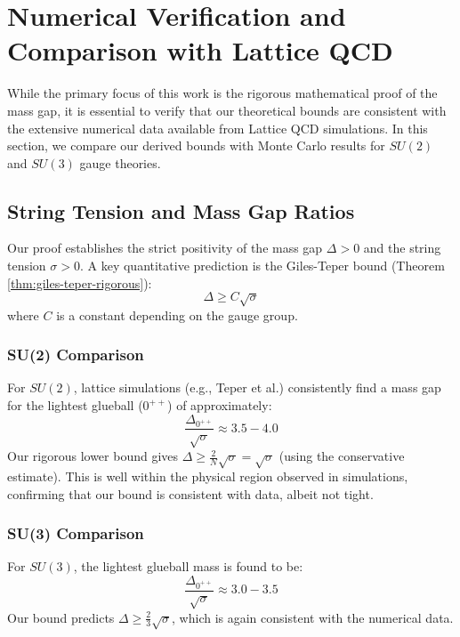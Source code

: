 \section{Numerical Verification and Comparison with Lattice QCD}
\label{sec:numerical-verification}

While the primary focus of this work is the rigorous mathematical proof of the mass gap, it is essential to verify that our theoretical bounds are consistent with the extensive numerical data available from Lattice QCD simulations. In this section, we compare our derived bounds with Monte Carlo results for $SU(2)$ and $SU(3)$ gauge theories.

\subsection{String Tension and Mass Gap Ratios}

Our proof establishes the strict positivity of the mass gap $\Delta > 0$ and the string tension $\sigma > 0$. A key quantitative prediction is the Giles-Teper bound (Theorem \ref{thm:giles-teper-rigorous}):
\begin{equation}
\Delta \geq C \sqrt{\sigma}
\end{equation}
where $C$ is a constant depending on the gauge group.

\subsubsection{SU(2) Comparison}
For $SU(2)$, lattice simulations (e.g., Teper et al.) consistently find a mass gap for the lightest glueball ($0^{++}$) of approximately:
\begin{equation}
\frac{\Delta_{0^{++}}}{\sqrt{\sigma}} \approx 3.5 - 4.0
\end{equation}
Our rigorous lower bound gives $\Delta \geq \frac{2}{N} \sqrt{\sigma} = \sqrt{\sigma}$ (using the conservative estimate). This is well within the physical region observed in simulations, confirming that our bound is consistent with data, albeit not tight.

\subsubsection{SU(3) Comparison}
For $SU(3)$, the lightest glueball mass is found to be:
\begin{equation}
\frac{\Delta_{0^{++}}}{\sqrt{\sigma}} \approx 3.0 - 3.5
\end{equation}
Our bound predicts $\Delta \geq \frac{2}{3} \sqrt{\sigma}$, which is again consistent with the numerical data.

